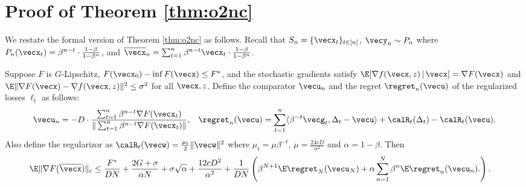 \section{Proof of Theorem \ref{thm:o2nc}}
\label{app:alg}

We restate the formal version of Theorem \ref{thm:o2nc} as follows.
Recall that $S_n = \{\vecx_t\}_{t\in[n]}$, $\vecy_n\sim P_n$ where $P_n(\vecx_t) = \beta^{n-t}\cdot \frac{1-\beta}{1-\beta^n}$, and $\overline \vecx_n = \sum_{t=1}^n \beta^{n-t}\vecx_t\cdot \frac{1-\beta}{1-\beta^n}$.

\begin{theorem}
\label{thm:o2nc-formal}
Suppose $F$ is $G$-Lipschitz, $F(\vecx_0)-\inf F(\vecx) \le F^*$, and the stochastic gradients satisfy $\E[\nabla f(\vecx,z)\,|\,\vecx] = \nabla F(\vecx)$ and $\E\|\nabla F(\vecx)-\nabla f(\vecx,z)\|^2\le \sigma^2$ for all $\vecx,z$. Define the comparator $\vecu_n$ and the regret $\regret_n(\vecu)$ of the regularized losses $\ell_t$ as follows:
\begin{align*}
    & \vecu_n = -D \cdot \frac{\sum_{t=1}^n \beta^{n-t}\nabla F(\vecx_t)}{\|\sum_{t=1}^n \beta^{n-t}\nabla F(\vecx_t)\|},
    & \regret_n(\vecu) 
    = \sum_{t=1}^n \langle \beta^{-t}\vecg_t, \Delta_t - \vecu \rangle + \calR_t(\Delta_t) - \calR_t(\vecu).
\end{align*}
Also define the regularizor as $\calR_t(\vecw) = \frac{\mu_t}{2}\|\vecw\|^2$ where $\mu_t = \mu\beta^{-t}$, $\mu=\frac{24cD}{\alpha^2}$ and $\alpha=1-\beta$. Then
\begin{align*}
    \E \|\nabla F(\overline\vecx)\|_c
    &\le \frac{F^*}{DN} + \frac{2G+\sigma}{\alpha N} + \sigma\sqrt{\alpha} + \frac{12c D^2}{\alpha^2} 
    + \frac{1}{DN}\left( \beta^{N+1}\E\regret_N(\vecu_N) + \alpha \sum_{n=1}^N \beta^n \E\regret_n(\vecu_n). \right).
\end{align*}
\end{theorem}

